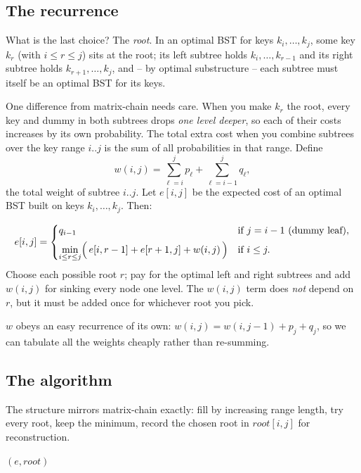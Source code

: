 \subsection{The recurrence}

What is the last choice? The \emph{root}. In an optimal BST for keys
$k_i, \dots, k_j$, some key $k_r$ (with $i \le r \le j$) sits at the root; its
left subtree holds $k_i,\dots,k_{r-1}$ and its right subtree holds
$k_{r+1},\dots,k_j$, and -- by optimal substructure -- each subtree must itself be
an optimal BST for its keys.

One difference from matrix-chain needs care. When you
make $k_r$ the root, every key and dummy in both subtrees drops \emph{one level
deeper}, so each of their costs increases by its own probability. The total
extra cost when you combine subtrees over the key range $i..j$ is the sum of
all probabilities in that range. Define
\[
  w(i,j) = \sum_{\ell=i}^{j} p_\ell + \sum_{\ell=i-1}^{j} q_\ell,
\]
the total weight of subtree $i..j$. Let $e[i,j]$ be the expected cost of an
optimal BST built on keys $k_i,\dots,k_j$. Then:

\begin{focusbox}
\[
  e[i,j] =
  \begin{cases}
    q_{i-1} & \text{if } j = i-1 \ (\text{dummy leaf}),\\[4pt]
    \displaystyle \min_{i \le r \le j}\Bigl(\, e[i,r-1] + e[r+1,j] + w(i,j) \,\Bigr) & \text{if } i \le j.
  \end{cases}
\]
Choose each possible root $r$; pay for the optimal left and right subtrees and
add $w(i,j)$ for sinking every node one level. The $w(i,j)$ term does
\emph{not} depend on $r$, but it must be added once for whichever root you pick.
\end{focusbox}

$w$ obeys an easy recurrence of its own:
$w(i,j) = w(i,j-1) + p_j + q_j$, so we can tabulate all the weights cheaply
rather than re-summing.

\subsection{The algorithm}

The structure mirrors matrix-chain exactly: fill by increasing range length,
try every root, keep the minimum, record the chosen root in $root[i,j]$ for
reconstruction.

\begin{algorithm}[H]
\caption{\textsc{Optimal-BST}$(p, q, n)$}
\Return $(e, root)$\;
\end{algorithm}

